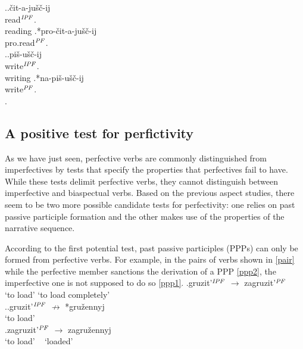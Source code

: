 \ex.\label{ex:part1}\ag.\label{ex:part11}\v{c}it-a-ju\v{s}\v{c}-ij\\
read$^{\mathit{IPF}}$.\\
reading
\bg.\label{ex:part12}*pro-\v{c}it-a-ju\v{s}\v{c}-ij\\
pro.read$^{\mathit{PF}}$.\\

\ex.\label{ex:part2}\ag.\label{ex:part21}pi\v{s}-u\v{s}\v{c}-ij\\
write$^{\mathit{IPF}}$.\\
writing
\bg.\label{ex:part22}*na-pi\v{s}-u\v{s}\v{c}-ij\\
write$^{\mathit{PF}}$.\\
\z.


\subsection{A positive test for perfictivity}\label{sec:tests:new}
As we have just seen, perfective verbs are commonly distinguished from imperfectives by tests that specify the properties that perfectives fail to have. While these tests delimit perfective verbs, they cannot distinguish between imperfective and biaspectual verbs. Based on the previous aspect studies, there seem to be two more possible candidate tests for perfectivity: one relies on past passive participle formation and the other makes use of the properties of the narrative sequence. %

According to the first potential test, past passive participles (PPPs) can only be formed from perfective verbs. For example, in the pairs of verbs shown in \ref{pair} while the perfective member sanctions the derivation of a PPP \ref{ppp2}, the imperfective one is not supposed to do so \ref{ppp1}.
\exg.\label{pair}{gruzit'$^{{\mathit{IPF}}}$} {$\rightarrow$} zagruzit'$^{{\mathit{PF}}}$\\
{`to load'} {} {`to load completely'}\\

\ex.\ag.\label{ppp1}gruzit'$^{{\mathit{IPF}}}$ $\nrightarrow$ *gru\v{z}ennyj\\
{`to load'} {~} {~}\\
\bg.\label{ppp2}zagruzit'$^{{\mathit{PF}}}$ {$\rightarrow$} zagru\v{z}ennyj\\
{`to load'} {~} {`loaded'}\\


